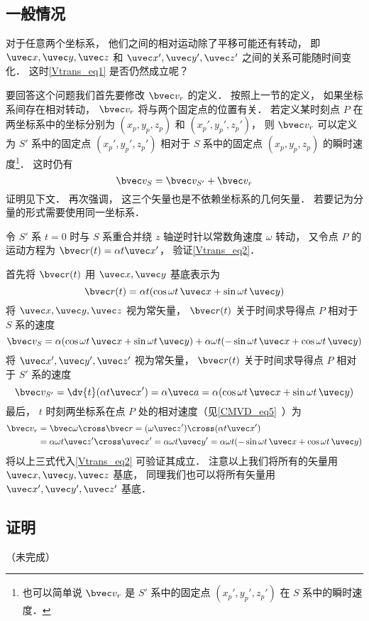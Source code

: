 \subsection{一般情况}
对于任意两个坐标系， 他们之间的相对运动除了平移可能还有转动， 即 $\uvec x, \uvec y, \uvec z$ 和 $\uvec x', \uvec y', \uvec z'$ 之间的关系可能随时间变化． 这时\autoref{Vtrans_eq1} 是否仍然成立呢？

要回答这个问题我们首先要修改 $\bvec v_r$ 的定义． 按照上一节的定义， 如果坐标系间存在相对转动， $\bvec v_r$ 将与两个固定点的位置有关． 若定义某时刻点 $P$ 在两坐标系中的坐标分别为 $(x_p, y_p, z_p)$ 和 $(x_p', y_p', z_p')$， 则 $\bvec v_r$ 可以定义为 $S'$ 系中的固定点 $(x_p', y_p', z_p')$ 相对于 $S$ 系中的固定点 $(x_p, y_p, z_p)$ 的瞬时速度\footnote{也可以简单说 $\bvec v_r$ 是 $S'$ 系中的固定点 $(x_p', y_p', z_p')$ 在 $S$ 系中的瞬时速度．}． 这时仍有
\begin{equation}\label{Vtrans_eq2}
\bvec v_{S} = \bvec v_{S'} + \bvec v_r
\end{equation}
证明见下文． 再次强调， 这三个矢量也是不依赖坐标系的几何矢量． 若要记为分量的形式需要使用同一坐标系．

\begin{example}{}\label{Vtrans_ex1}
令 $S'$ 系 $t = 0$ 时与 $S$ 系重合并绕 $z$ 轴逆时针以常数角速度 $\omega$ 转动， 又令点 $P$ 的运动方程为 $\bvec r(t) = \alpha t \uvec x'$， 验证\autoref{Vtrans_eq2}．

首先将 $\bvec r(t)$ 用 $\uvec x, \uvec y$ 基底表示为
\begin{equation}
\bvec r(t) = \alpha t (\cos\omega t\, \uvec x + \sin\omega t\, \uvec y)
\end{equation}
将 $\uvec x, \uvec y, \uvec z$ 视为常矢量， $\bvec r(t)$ 关于时间求导得点 $P$ 相对于 $S$ 系的速度
\begin{equation}
\bvec v_S = \alpha (\cos\omega t \,\uvec x + \sin\omega t \,\uvec y)
+ \alpha\omega t (-\sin\omega t \,\uvec x + \cos\omega t \,\uvec y)
\end{equation}
将 $\uvec x', \uvec y', \uvec z'$ 视为常矢量， $\bvec r(t)$ 关于时间求导得点 $P$ 相对于 $S'$ 系的速度
\begin{equation}
\bvec v_{S'} = \dv{t} (\alpha t \uvec x') = \alpha \uvec a = \alpha (\cos\omega t\, \uvec x + \sin\omega t \,\uvec y)
\end{equation}
最后， $t$ 时刻两坐标系在点 $P$ 处的相对速度（见\autoref{CMVD_eq5}~）为
\begin{equation}
\begin{aligned}
\bvec v_r &= \bvec\omega \cross \bvec r = (\omega \uvec z') \cross (\alpha t \uvec x') \\
&= \alpha\omega t \uvec z'\cross\uvec x' = \alpha\omega t \uvec y' = \alpha\omega t(-\sin \omega t \,\uvec x + \cos\omega t \,\uvec y)
\end{aligned}
\end{equation}
将以上三式代入\autoref{Vtrans_eq2} 可验证其成立． 注意以上我们将所有的矢量用 $\uvec x, \uvec y, \uvec z$ 基底， 同理我们也可以将所有矢量用 $\uvec x', \uvec y', \uvec z'$ 基底．
\end{example}

\subsection{证明}
（未完成）%
